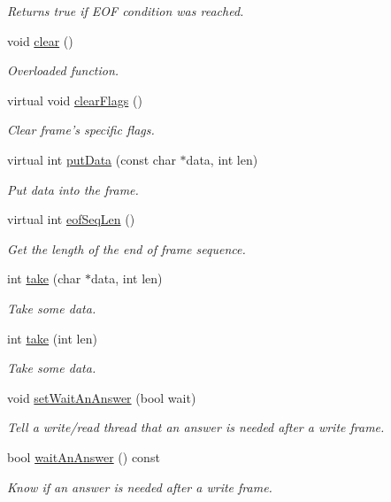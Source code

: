 \begin{DoxyCompactItemize}
\begin{DoxyCompactList}\small\item\em Returns true if EOF condition was reached. \end{DoxyCompactList}\item 
void \hyperlink{classmdt_frame_acdf8a921a3f36ca91af88b55b90febdc}{clear} ()
\begin{DoxyCompactList}\small\item\em Overloaded function. \end{DoxyCompactList}\item 
virtual void \hyperlink{classmdt_frame_ae068ca1ae47516306f5180ffc1712d78}{clearFlags} ()
\begin{DoxyCompactList}\small\item\em Clear frame's specific flags. \end{DoxyCompactList}\item 
virtual int \hyperlink{classmdt_frame_ae63af784d2fc54430ea5db4dc80b7ec8}{putData} (const char $\ast$data, int len)
\begin{DoxyCompactList}\small\item\em Put data into the frame. \end{DoxyCompactList}\item 
virtual int \hyperlink{classmdt_frame_a0e0dcfb9d284ac0dae550db33f0fbece}{eofSeqLen} ()
\begin{DoxyCompactList}\small\item\em Get the length of the end of frame sequence. \end{DoxyCompactList}\item 
int \hyperlink{classmdt_frame_a36e4b85a3c671902ac3c8cc318ca726c}{take} (char $\ast$data, int len)
\begin{DoxyCompactList}\small\item\em Take some data. \end{DoxyCompactList}\item 
int \hyperlink{classmdt_frame_ad8b184e6eb07a26fe84deaf233c1aa9b}{take} (int len)
\begin{DoxyCompactList}\small\item\em Take some data. \end{DoxyCompactList}\item 
void \hyperlink{classmdt_frame_a3b9a331858df9061879592fab1b346f5}{setWaitAnAnswer} (bool wait)
\begin{DoxyCompactList}\small\item\em Tell a write/read thread that an answer is needed after a write frame. \end{DoxyCompactList}\item 
bool \hyperlink{classmdt_frame_ab27455f2fa3415a96482786c0ec27e55}{waitAnAnswer} () const 
\begin{DoxyCompactList}\small\item\em Know if an answer is needed after a write frame. \end{DoxyCompactList}\end{DoxyCompactItemize}
